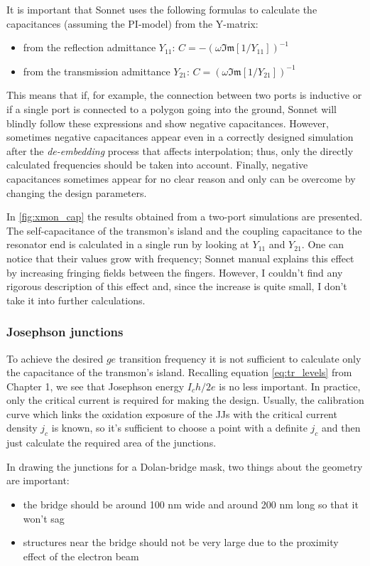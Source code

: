 It is important that Sonnet uses the following formulas to calculate the capacitances (assuming the PI-model) from the Y-matrix:
\begin{itemize}[topsep=0pt, noitemsep]
\item from the reflection admittance $Y_{11}$: $C = -(\omega \mathfrak{Im}[1/Y_{11}])^{-1}$
\item from the transmission admittance $Y_{21}$: $C = (\omega \mathfrak{Im}[1/Y_{21}])^{-1}$
\end{itemize}
This means that if, for example, the connection between two ports is inductive or if a single port is connected to a polygon going into the ground, Sonnet will blindly follow these expressions and show negative capacitances. However, sometimes negative capacitances appear even in a correctly designed simulation after the \textit{de-embedding} process that affects interpolation; thus, only the directly calculated frequencies should be taken into account. Finally, negative capacitances sometimes appear for no clear reason and only can be overcome by changing the design parameters.

In \autoref{fig:xmon_cap} the results obtained from a two-port simulations are presented. The self-capacitance of the transmon's island and the coupling capacitance to the resonator end is calculated in a single run by looking at $Y_{11}$ and  $Y_{21}$. One can notice that their values grow with frequency; Sonnet manual explains this effect by increasing fringing fields between the fingers. However, I couldn't find any rigorous description of this effect and, since the increase is quite small, I don't take it into further calculations.

\subsubsection{Josephson junctions}

To achieve the desired $ge$ transition frequency it is not sufficient to calculate only the capacitance of the transmon's island. Recalling equation \eqref{eq:tr_levels} from Chapter 1, we see that Josephson energy $I_c h/2e$ is no less important. In practice, only the critical current is required for making the design. Usually, the calibration curve which links the oxidation exposure of the JJs with the critical current density $j_c$ is known, so it's sufficient to choose a point with a definite $j_c$ and then just calculate the required area of the junctions.

In drawing the junctions for a Dolan-bridge\cite{dolan1977} mask, two things about the geometry are important:
\begin{itemize}[topsep=0pt, noitemsep]
\item the bridge should be around 100 nm wide and around 200 nm long so that it won't sag 
\item structures near the bridge should not be very large due to the proximity effect of the electron beam
\end{itemize}

